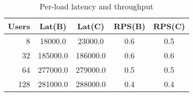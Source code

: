 \begin{table}[t]
\caption{Per-load latency and throughput}
\centering
\begin{tabular}{r|cc|cc}
Users & Lat(B) & Lat(C) & RPS(B) & RPS(C) \\
\hline
8 & 18000.0 & 23000.0 & 0.6 & 0.5 \\
32 & 185000.0 & 186000.0 & 0.6 & 0.6 \\
64 & 277000.0 & 279000.0 & 0.5 & 0.5 \\
128 & 281000.0 & 288000.0 & 0.4 & 0.4 \\
\end{tabular}
\end{table}
